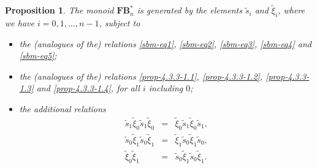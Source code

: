 \documentclass[a4paper]{amsart}
\newtheorem{proposition}[theorem]{Proposition}
\begin{document}
\begin{proposition}\label{prop-4.3.7-1}
The monoid $\mathbf{FB}^*_n$ is generated by the elements
$\tilde{s}_i$ and $\tilde{\xi}_{i}$, where we have  $i=0,1,\dots,n-1$, subject to
\begin{itemize}
\item the (analogues of the) relations \eqref{sbm-eq1}, 
\eqref{sbm-eq2}, \eqref{sbm-eq3}, \eqref{sbm-eq4} and \eqref{sbm-eq5}; 
\item the (analogues of the) relations \eqref{prop-4.3.3-1.1}, 
\eqref{prop-4.3.3-1.2}, \eqref{prop-4.3.3-1.3} and
\eqref{prop-4.3.3-1.4}, for all $i$ including $0$;
\item the additional relations 
\begin{eqnarray}
\tilde{s}_1\tilde{\xi}_0\tilde{s}_1\tilde{\xi}_0&=&
\tilde{\xi}_0\tilde{s}_1\tilde{\xi}_0\tilde{s}_1,\label{prop-4.3.7-1-rel1}\\ 
\tilde{s}_0\tilde{\xi}_1\tilde{s}_0\tilde{\xi}_1 &=&
\tilde{\xi}_1\tilde{s}_0\tilde{\xi}_1\tilde{s}_0,\label{prop-4.3.7-1-rel2}\\ 
\tilde{\xi}_0\tilde{\xi}_1 &=&
\tilde{s}_0\tilde{\xi}_1\tilde{s}_0\tilde{\xi}_1.\label{prop-4.3.7-1-rel3}
\end{eqnarray}
\end{itemize}
\end{proposition}
\end{document}
